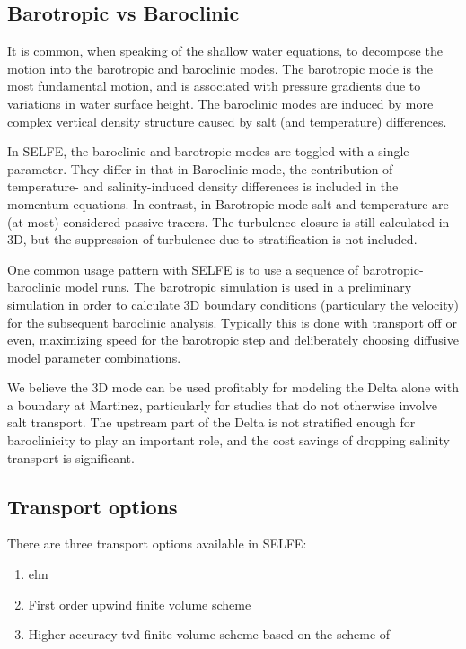 \subsection{Barotropic vs Baroclinic}
It is common, when speaking of the shallow water equations, to decompose the motion into
the barotropic and baroclinic modes. The barotropic mode is the most fundamental motion, 
and is associated with pressure gradients due to  variations in water surface height.
The baroclinic modes are induced by more complex vertical density structure
caused by salt (and temperature) differences.

In SELFE, the baroclinic and barotropic modes are toggled with a single parameter. They differ in that in Baroclinic mode, the contribution of temperature- and salinity-induced density differences is included in the momentum equations. In contrast, in Barotropic mode salt and temperature are (at most) considered passive tracers.
The turbulence closure is still calculated in 3D, but the suppression of turbulence due to stratification is not included.

One common usage pattern with SELFE is to use a sequence of barotropic-baroclinic model runs. The barotropic simulation is used in a preliminary simulation in order to calculate 3D boundary conditions (particulary the velocity) for the subsequent baroclinic analysis. Typically this is done with transport off or even, maximizing speed for the barotropic step and deliberately choosing diffusive model parameter combinations.

We believe the 3D mode can be used profitably for modeling the Delta alone with a boundary at Martinez,
particularly for studies that do not otherwise involve salt transport. The upstream part of the Delta is not stratified enough for baroclinicity to play an important role, and the cost savings of dropping salinity transport
is significant.

\subsection{Transport options}
There are three transport options available in SELFE:
\begin{enumerate}
\item \gls{elm}
\item First order upwind finite volume scheme
\item Higher accuracy \gls{tvd} finite volume scheme based on the scheme of \citet{Casulli05}
\end{enumerate}

